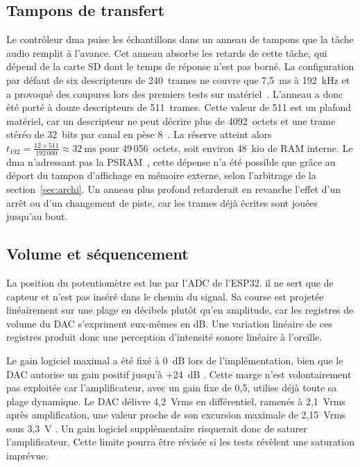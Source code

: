 \subsection{Tampons de transfert}

Le contrôleur \gls{dma} puise les échantillons dans un anneau de tampons que la tâche audio remplit à l'avance. Cet anneau absorbe les retards de cette tâche, qui dépend de la carte SD dont le temps de réponse n'est pas borné. La configuration par défaut de six descripteurs de 240~trames ne couvre que 7,5~ms à 192~kHz et a provoqué des coupures lors des premiers tests sur matériel~\cite{ESP32_IDF_i2s}. L'anneau a donc été porté à douze descripteurs de 511~trames. Cette valeur de 511 est un plafond matériel, car un descripteur ne peut décrire plus de 4092~octets et une trame stéréo de 32~bits par canal en pèse 8~\cite{ESP32_Technical_Reference_Manual}. La réserve atteint alors $t_{192} = \frac{12 \times 511}{192\,000} \approx 32~\text{ms}$ pour 49\,056~octets, soit environ 48~kio de RAM interne. Le \gls{dma} n'adressant pas la PSRAM~\cite{ESP32_IDF_guide}, cette dépense n'a été possible que grâce au déport du tampon d'affichage en mémoire externe, selon l'arbitrage de la section~\ref{sec:archi}. Un anneau plus profond retarderait en revanche l'effet d'un arrêt ou d'un changement de piste, car les trames déjà écrites sont jouées jusqu'au bout.

\subsection{Volume et séquencement}
\label{sec:volume_jack}

La position du potentiomètre est lue par l'ADC de l'ESP32. il ne sert que de capteur et n'est pas inséré dans le chemin du signal. Sa course est projetée linéairement sur une plage en décibels plutôt qu'en amplitude, car les registres de volume du DAC s'expriment eux-mêmes en dB. Une variation linéaire de ces registres produit donc une perception d'intensité sonore linéaire à l'oreille.

Le gain logiciel maximal a été fixé à 0~dB lors de l'implémentation, bien que le DAC autorise un gain positif jusqu'à +24~dB \cite{TI_PCM5242}. Cette marge n'est volontairement pas exploitée car l'amplificateur, avec un gain fixe de 0,5, utilise déjà toute sa plage dynamique. Le DAC délivre 4,2~Vrms en différentiel, ramenés à 2,1~Vrms après amplification, une valeur proche de son excursion maximale de 2,15~Vrms sous 3,3~V \cite{analog_MAX97220A}. Un gain logiciel supplémentaire risquerait donc de saturer l'amplificateur. Cette limite pourra être révisée si les tests révèlent une saturation imprévue.


